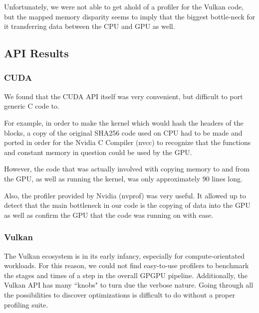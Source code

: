 \documentclass{article}
\begin{document}
Unfortunately, we were not able to get ahold of a profiler for the Vulkan code, but the mapped memory disparity seems to imply that the biggest bottle-neck for it transferring data between the CPU and GPU as well.

\subsection {API Results}

\subsubsection {CUDA}

We found that the CUDA API itself was very convenient, but difficult to port generic C code to.

For example, in order to make the kernel which would hash the headers of the blocks, a copy of the original SHA256 code used on CPU had to be made and ported in order for the Nvidia C Compiler (nvcc) to recognize that the functions and constant memory in question could be used by the GPU.

However, the code that was actually involved with copying memory to and from the GPU, as well as running the kernel, was only approximately 90 lines long.

Also, the profiler provided by Nvidia (nvprof) was very useful. It allowed up to detect that the main bottleneck in our code is the copying of data into the GPU as well as confirm the GPU that the code was running on with ease.


\subsubsection{Vulkan}

The Vulkan ecosystem is in its early infancy, especially for compute-orientated workloads. For this reason, we could not find easy-to-use profilers to benchmark the stages and times of a step in the overall GPGPU pipeline. Additionally, the Vulkan API has many ``knobs" to turn due the verbose nature. Going through all the possibilities to discover optimizations is difficult to do without a proper profiling suite.
\end{document}

